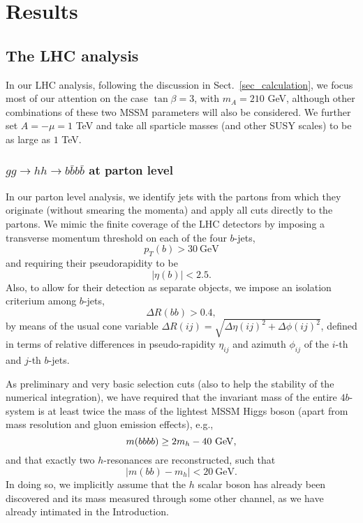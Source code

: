 \section{Results}
\label{sec_results}

\subsection{The LHC analysis}
\label{subsec_LHC}

In our LHC analysis, following the discussion in Sect.~\ref{sec_calculation},
we focus most of our attention on the case $\tan\beta=3$, with 
$m_A=210$ GeV, although other combinations of these two MSSM parameters
will also be considered.
We further set $A=-\mu=1$ TeV and take all sparticle masses (and other SUSY
scales) to be as large as $1$ TeV.

\subsubsection{$gg\to hh\to b\bar{b}b\bar{b}$ at parton level}
\label{subsubsec_parton_LHC}

In our parton level analysis, we identify jets with the partons from
which they originate (without smearing the momenta) and apply all cuts
directly to the partons.
We mimic the finite coverage of the LHC detectors by imposing a
transverse momentum threshold on each of the four $b$-jets, 
\begin{equation}\label{pTbcut_LHC}
p_T({b}) > 30~{\mathrm{GeV}}
\end{equation}
and requiring their pseudorapidity to be 
\begin{equation}\label{etabcut_LHC}
|\eta({b})| < 2.5.
\end{equation}
Also, to allow for their detection as separate objects, we impose
an isolation criterium among $b$-jets,
\begin{equation}\label{Rbbcut_LHC}
\Delta R({bb})>0.4,
\end{equation}
by means of  the usual cone variable
$\Delta R({ij})=\sqrt{\Delta\eta({ij})^2+\Delta\phi({ij})^2}$,
defined in terms of relative differences in pseudo-rapidity
$\eta_{ij}$ and azimuth $\phi_{ij}$ of the $i$-th and $j$-th $b$-jets.

As preliminary and very basic selection cuts (also to
help the stability of the numerical integration), we have required that
the invariant mass of the entire $4b$-system is at least twice the
mass of the lightest MSSM Higgs boson (apart from mass resolution and
gluon emission effects), e.g., 
\begin{equation}\label{Mbbbbcut_LHC}
m({bbbb})\ge 2m_h-40~{\rm{GeV}},
\end{equation}
and that exactly two $h$-resonances are reconstructed, such that
\begin{equation}\label{Mbbcut_LHC}
|m({bb})-m_h|<20~{\mathrm{GeV}}.
\end{equation}
In doing so, we implicitly assume that the $h$ scalar boson has
already been discovered and its mass measured through some other
channel, as we have already intimated in the Introduction. 

